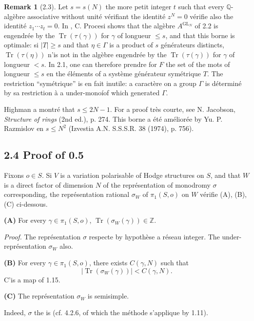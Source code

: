 \documentclass[12pt,a4paper]{article}
\theoremstyle{plain}
\theoremstyle{definition}
\newtheorem{remark}{Remark}[section]
\DeclareMathOperator{\Tr}{Tr}
\DeclareMathOperator{\GL}{GL}
\newcommand{\QQ}{\mathbb{Q}}
\newcommand{\ZZ}{\mathbb{Z}}
\begin{document}
{\begin{remark}[2.3]
Let $s = s(N)$ the more petit integer $t$ such that every $\QQ$-alg\`{e}bre associative without unit\'{e} v\'{e}rifiant the identit\'{e} $z^{N} = 0$ v\'{e}rifie also the identit\'{e} $z_{1} \cdots z_{t} = 0$. In \cite{Procesi}, C. Procesi shows that the alg\`{e}bre $A^{\GL_{N}}$ of 2.2 is engendr\'{e}e by the $\Tr(\tau(\gamma))$ for $\gamma$ of longueur $\leq s$, and that this borne is optimale: si $|T| \geq s$ and that $\eta \in \Gamma$ is a product of $s$ g\'{e}n\'{e}rateurs distincts, $\Tr(\tau(\eta))$ n'is not in the alg\`{e}bre engendr\'{e}e by the $\Tr(\tau(\gamma))$ for $\gamma$ of longueur $< s$. In 2.1, one can therefore prendre for $F$ the set of the mots of longueur $\leq s$ en the \'{e}l\'{e}ments of a syst\`{e}me g\'{e}n\'{e}rateur sym\'{e}trique $T$. The restriction ``sym\'{e}trique'' is en fait inutile: a caract\`{e}re on a group $\Gamma$ is d\'{e}termin\'{e} by sa restriction \`{a} a under-mono\'{i}of which generated $\Gamma$.

Highman a montr\'{e} that $s \leq 2N - 1$. For a proof tr\`{e}s courte, see N. Jacobson, \textit{Structure of rings} (2nd ed.), p. 274. This borne a \'{e}t\'{e} am\'{e}lior\'{e}e by Yu. P. Razmislov en $s \leq N^{2}$ (Izvestia A.N. S.S.S.R. 38 (1974), p. 756).
\end{remark}

\subsection*{2.4 Proof of 0.5}
Fixons $o \in S$. Si $V$ is a variation polarisable of Hodge structures on $S$, and that $W$ is a direct factor of dimension $N$ of the repr\'{e}sentation of monodromy $\sigma$ corresponding, the repr\'{e}sentation rational $\sigma_{W}$ of $\pi_{1}(S,o)$ on $W$ v\'{e}rifie (A), (B), (C) ci-dessous.

\textbf{(A)} For every $\gamma \in \pi_{1}(S,o)$, $\Tr(\sigma_{W}(\gamma)) \in \ZZ$.

\textit{Proof.} The repr\'{e}sentation $\sigma$ respecte by hypoth\`{e}se a r\'{e}seau integer. The under-repr\'{e}sentation $\sigma_{W}$ also.

\textbf{(B)} For every $\gamma \in \pi_{1}(S,o)$, there exists $C(\gamma, N)$ such that
\[
|\Tr(\sigma_{W}(\gamma))| < C(\gamma, N).
\]
C'is a map of 1.15.

\textbf{(C)} The repr\'{e}sentation $\sigma_{W}$ is semisimple.

Indeed, $\sigma$ the is (cf. \cite{HodgeII} 4.2.6, of which the m\'{e}thode s'applique by 1.11).

}
\end{document}
